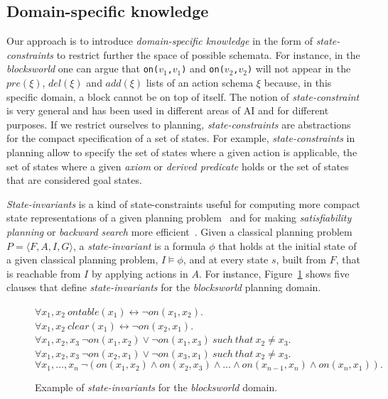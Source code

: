 \documentclass{article}
\newcommand{\tup}[1]{{\langle #1 \rangle}}
\begin{document}
\subsection{Domain-specific knowledge}
Our approach is to introduce {\em domain-specific knowledge} in the form of {\em state-constraints} to restrict further the space of possible schemata. For instance, in the {\em blocksworld} one can argue that {\small\tt on($v_1$,$v_1$)} and {\small\tt on($v_2$,$v_2$)} will not appear in the $pre(\xi)$, $del(\xi)$ and $add(\xi)$ lists of an action schema $\xi$ because, in this specific domain, a block cannot be on top of itself. The notion of {\em state-constraint} is very general and has been used in different areas of AI and for different purposes.  If we restrict ourselves to planning, {\em state-constraints} are abstractions for the compact specification of a set of states. For example, {\em state-constraints} in planning allow to specify the set of states where a given action is applicable, the set of states where a given {\em axiom} or {\em derived predicate} holds or the set of states that are considered goal states.

{\em State-invariants} is a kind of state-constraints useful for computing more compact state representations of a given planning problem~\cite{helmert2009concise} and for making {\em satisfiability planning} or {\em backward search} more efficient~\cite{rintanen2014madagascar,alcazar2015reminder}. Given a classical planning problem $P=\tup{F,A,I,G}$, a {\em state-invariant} is a formula $\phi$ that holds at the initial state of a given classical planning problem, $I\models \phi$, and at every state $s$, built from $F$, that is reachable from $I$ by applying actions in $A$. For instance, Figure~\ref{fig:strongest-invariant} shows five clauses that define {\em state-invariants} for the {\em blocksworld} planning domain.

\begin{figure}[hbt!]
  \begin{footnotesize}
$\forall x_1,x_2\ ontable(x_1)\leftrightarrow\neg on(x_1,x_2)$.\\
$\forall x_1,x_2\ clear(x_1)\leftrightarrow\neg on(x_2,x_1)$.\\
$\forall x_1,x_2,x_3\ \neg on(x_1,x_2)\vee\neg on(x_1,x_3)\ such\ that\ x_2\neq x_3$.\\
$\forall x_1,x_2,x_3\ \neg on(x_2,x_1)\vee\neg on(x_3,x_1)\ such\ that\ x_2\neq x_3$.\\
$\forall x_1,\ldots,x_n\ \neg(on(x_1,x_2)\wedge on(x_2,x_3)\wedge\ldots\wedge on(x_{n-1},x_n)\wedge on(x_n,x_1)).$
\end{footnotesize}
 \caption{\small Example of {\em state-invariants} for the {\em blocksworld} domain.}
\label{fig:strongest-invariant}
\end{figure}
\end{document}
